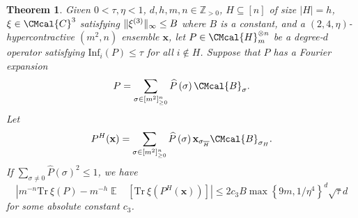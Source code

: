 \documentclass[10pt,a4paper]{article}
\def\B{\CMcal{B}}
\def\C{\CMcal{C}}
\def\H{\CMcal{H}}
\theoremstyle{plain}
\newtheorem{theorem}{Theorem}[section]
\theoremstyle{definition}
\newcommand {\minusspace} {\: \! \!}
\newcommand {\Fn} [2] {\ensuremath{ #1 \minusspace \Br{ #2 } }}
\newcommand {\set} [1] {\ensuremath{ \left\lbrace #1 \right\rbrace }}
\newcommand {\br} [1] {\ensuremath{ \left( #1 \right) }}
\newcommand {\Br} [1] {\ensuremath{ \left[ #1 \right] }}
\DeclarePairedDelimiter{\norm}{\lVert}{\rVert}
\newcommand {\ab} [1] {\ensuremath{ \left| #1 \right| }}
\DeclareMathOperator*{\bigE}{\mathbb{E}}
\newcommand {\expec} [2] {\Fn{\bigE_{\substack{#1}}}{#2}}
\newcommand {\Tr} {\ensuremath{ \mathrm{Tr} }}
\newcommand{\posint}{{\mathbb Z}_{>0}}
\newcommand{\randx}{\ensuremath{\mathbf{x}}}
\newcommand{\infi}[1]{\ensuremath{\mathrm{Inf}_i}\br{#1}}
\newcommand{\sigmarange}[1]{\ensuremath{\sigma\in[m^2]_{\geq0}^{#1}}}
\newcommand{\1}{\mathbb{1}} %
\begin{document}
\begin{theorem}\label{lem:generalinvariance}
	Given $0<\tau,\eta<1$, $d,h,m,n\in\posint$, $H\subseteq[n]$ of size $\ab{H}=h$, $\xi\in\C^{3}$ satisfying $\norm{\xi^{(3)}}_\infty\leq B$ where $B$ is a constant, and a $(2,4,\eta)$-hypercontractive  $(m^2,n)$ ensemble $\randx$, let $P\in\H_m^{\otimes n}$ be a degree-$d$ operator satisfying $\infi{P}\leq\tau$ for all $i\notin H$. Suppose that $P$ has a Fourier expansion
	\[P=\sum_{\sigmarange{n}}\widehat{P}\br{\sigma}\B_\sigma.\]
	Let 
	\[P^H(\randx)=\sum_{\sigmarange{n}}\widehat{P}\br{\sigma}\randx_{\sigma_{\overline{H}}}\B_{\sigma_H}.\]
	If $\sum_{\sigma\ne0}\widehat{P}\br{\sigma}^2\leq1$, we have
	\[\ab{m^{-n}\Tr~\xi\br{P}-m^{-h}\expec{}{\Tr~\xi\br{P^H(\randx)}}}\leq 2c_3B \max\set{9m,1/\eta^4}^d\sqrt{\tau}d\]
	for some absolute constant $c_3$.
\end{theorem}
\end{document}
